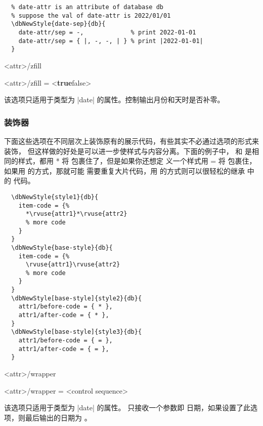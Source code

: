 \documentclass[full]{l3doc}
\def\orbar{\textup{\textbar}}
\def\defaultval#1{\textbf{\textup{#1}}}
\def\TTF{\defaultval{true}\orbar false}
\begin{document}
\begin{documentation}
\begin{verbatim}
  % date-attr is an attribute of database db
  % suppose the val of date-attr is 2022/01/01
  \dbNewStyle{date-sep}{db}{
    date-attr/sep = -,             % print 2022-01-01
    date-attr/sep = { |, -, -, | } % print |2022-01-01|
  }
\end{verbatim}

\begin{option}[added=2022-01-08, EXP]{<attr>/zfill}
  \begin{syntax}
    <attr>/zfill = <\TTF>
  \end{syntax}

  该选项只适用于类型为 |date| 的属性。控制输出月份和天时是否补零。
\end{option}

\subsubsection{装饰器}

下面这些选项在不同层次上装饰原有的展示代码，有些其实不必通过选项的形式来装饰，
但这样做的好处是可以进一步使样式与内容分离。下面的例子中， 和
 是相同的样式，都用 * 将  包裹住了，但是如果你还想定
义一个样式用 = 将  包裹住，如果用  的方式，那就可能
需要重复大片代码，用  的方式则可以很轻松的继承  中的
代码。

\begin{verbatim}
  \dbNewStyle{style1}{db}{
    item-code = {%
      *\rvuse{attr1}*\rvuse{attr2}
      % more code
    }
  }
  \dbNewStyle{base-style}{db}{
    item-code = {%
      \rvuse{attr1}\rvuse{attr2}
      % more code
    }
  }
  \dbNewStyle[base-style]{style2}{db}{
    attr1/before-code = { * },
    attr1/after-code = { * },
  }
  \dbNewStyle[base-style]{style3}{db}{
    attr1/before-code = { = },
    attr1/after-code = { = },
  }
\end{verbatim}

\begin{option}[added=2022-01-08, rEXP]{<attr>/wrapper}
  \begin{syntax}
    <attr>/wrapper = <control sequence>
  \end{syntax}

  该选项只适用于类型为 |date| 的属性。 只接收一个参数即
  日期，如果设置了此选项，则最后输出的日期为
  。
\end{option}


\end{documentation}
\end{document}
